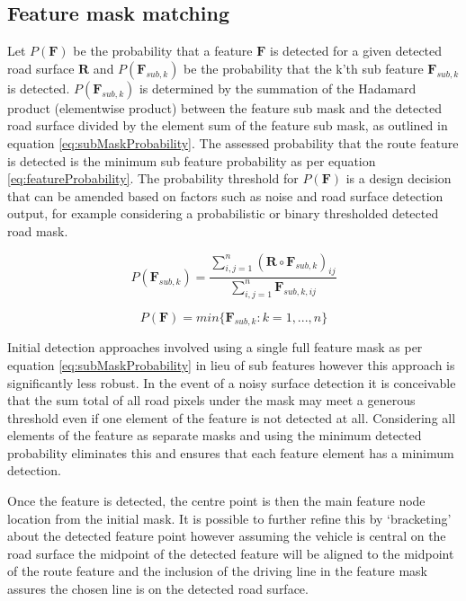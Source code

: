 \documentclass[]{aiaa-tc}%
\begin{document}
\subsection{Feature mask matching} 

Let $P(\textbf{F})$ be the probability that a feature $\textbf{F}$ is detected for a given detected road surface $\textbf{R}$ and $P(\textbf{F}_{sub,k})$ be the probability that the k'th sub feature $\textbf{F}_{sub,k}$ is detected. $P(\textbf{F}_{sub,k})$ is determined by the summation of the Hadamard product (elementwise product) between the feature sub mask and the detected road surface divided by the element sum of the feature sub mask, as outlined in equation \ref{eq:subMaskProbability}. The assessed probability that the route feature is detected is the minimum sub feature probability as per equation \ref{eq:featureProbability}. The probability threshold for $P(\textbf{F})$ is a design decision that can be amended based on factors such as noise and road surface detection output, for example considering a probabilistic or binary thresholded detected road mask.

\begin{equation}\label{eq:subMaskProbability}
	P(\textbf{F}_{sub,k}) = \frac{\sum_{i,j=1}^{n} (\textbf{R} \circ \textbf{F}_{sub,k})_{ij}}{\sum_{i,j=1}^{n} \textbf{F}_{sub,k,ij}}
\end{equation}

\begin{equation}\label{eq:featureProbability}
	P(\textbf{F}) = min\{\textbf{F}_{sub,k}:k=1,...,n\}
\end{equation}

Initial detection approaches involved using a single full feature mask as per equation \ref{eq:subMaskProbability} in lieu of sub features however this approach is significantly less robust. In the event of a noisy surface detection it is conceivable that the sum total of all road pixels under the mask may meet a generous threshold even if one element of the feature is not detected at all. Considering all elements of the feature as separate masks and using the minimum detected probability eliminates this and ensures that each feature element has a minimum detection. 

Once the feature is detected, the centre point is then the main feature node location from the initial mask. It is possible to further refine this by `bracketing' about the detected feature point however assuming the vehicle is central on the road surface the midpoint of the detected feature will be aligned to the midpoint of the route feature and the inclusion of the driving line in the feature mask assures the chosen line is on the detected road surface.
\end{document}
